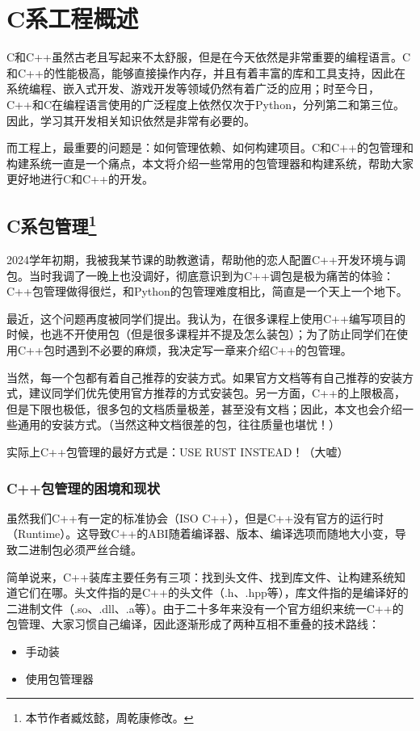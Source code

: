 \chapter{C系工程概述}\label{chap:cpp-project}

C和C++虽然古老且写起来不太舒服，但是在今天依然是非常重要的编程语言。C和C++的性能极高，能够直接操作内存，并且有着丰富的库和工具支持，因此在系统编程、嵌入式开发、游戏开发等领域仍然有着广泛的应用；时至今日，C++和C在编程语言使用的广泛程度上依然仅次于Python，分列第二和第三位。因此，学习其开发相关知识依然是非常有必要的。

而工程上，最重要的问题是：如何管理依赖、如何构建项目。C和C++的包管理和构建系统一直是一个痛点，本文将介绍一些常用的包管理器和构建系统，帮助大家更好地进行C和C++的开发。

\section[C系包管理]{C系包管理\protect\footnote{本节作者臧炫懿，周乾康修改。}}

2024学年初期，我被我某节课的助教邀请，帮助他的恋人配置C++开发环境与调包。当时我调了一晚上也没调好，彻底意识到为C++调包是极为痛苦的体验：C++包管理做得很烂，和Python的包管理难度相比，简直是一个天上一个地下。

最近，这个问题再度被同学们提出。我认为，在很多课程上使用C++编写项目的时候，也逃不开使用包（但是很多课程并不提及怎么装包）；为了防止同学们在使用C++包时遇到不必要的麻烦，我决定写一章来介绍C++的包管理。

当然，每一个包都有着自己推荐的安装方式。如果官方文档等有自己推荐的安装方式，建议同学们优先使用官方推荐的方式安装包。另一方面，C++的上限极高，但是下限也极低，很多包的文档质量极差，甚至没有文档；因此，本文也会介绍一些通用的安装方式。（当然这种文档很差的包，往往质量也堪忧！）

实际上C++包管理的最好方式是：USE RUST INSTEAD！（大嘘）

\subsection{C++包管理的困境和现状}

虽然我们C++有一定的标准协会（ISO C++），但是C++没有官方的运行时（Runtime）。这导致C++的ABI随着编译器、版本、编译选项而随地大小变，导致二进制包必须严丝合缝。

简单说来，C++装库主要任务有三项：找到头文件、找到库文件、让构建系统知道它们在哪。头文件指的是C++的头文件（.h、.hpp等），库文件指的是编译好的二进制文件（.so、.dll、.a等）。由于二十多年来没有一个官方组织来统一C++的包管理、大家习惯自己编译，因此逐渐形成了两种互相不重叠的技术路线：
\begin{itemize}
    \item 手动装
    \item 使用包管理器
\end{itemize}

